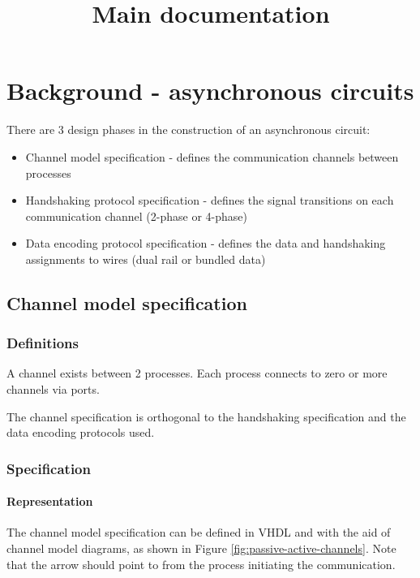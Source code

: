 \documentclass{report}
\title{Main documentation}
\begin{document}

\chapter {Background - asynchronous circuits}

There are 3 design phases in the construction of an asynchronous circuit:

\begin{itemize}
    \item Channel model specification - defines the communication channels
    between processes
    \item Handshaking protocol specification - defines the signal transitions on
    each communication channel (2-phase or 4-phase)
    \item Data encoding protocol specification - defines the data and
    handshaking assignments to wires (dual rail or bundled data)
\end{itemize}


\section {Channel model specification}

\subsection {Definitions}

A channel exists between 2 processes. Each process connects to zero or more
channels via ports.

The channel specification is orthogonal to the handshaking specification and
the data encoding protocols used.


\subsection {Specification}

\subsubsection {Representation}

The channel model specification can be defined in VHDL and with the aid of
channel model diagrams, as shown in Figure \ref{fig:passive-active-channels}.
Note that the arrow should point to from the process initiating the
communication.
\end{document}

